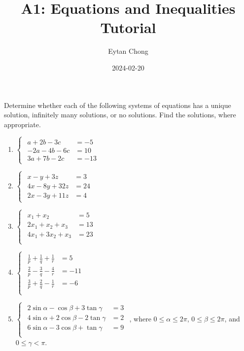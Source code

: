 \documentclass{jhwhw}
\title{A1: Equations and Inequalities\\Tutorial}
\author{Eytan Chong}
\date{2024-02-20}
\begin{document}
    \problem{}
        Determine whether each of the following systems of equations has a unique solution, infinitely many solutions, or no solutions. Find the solutions, where appropriate.

        \begin{enumerate}
            \item $\begin{cases}
                \begin{aligned}
                    a + 2b - 3c &= -5\\
                    -2a - 4b - 6c &= 10\\
                    3a + 7b - 2c &= -13
                \end{aligned}
            \end{cases}$
            \item $\begin{cases}
                \begin{aligned}
                x - y + 3z &= 3\\
                4x - 8y + 32z &= 24\\
                2x - 3y + 11z &= 4
                \end{aligned}
            \end{cases}$
            \item $\begin{cases}
                \begin{aligned}
                    x_1 + x_2 &= 5\\
                    2x_1 + x_2 + x_3 &= 13\\
                    4x_1 + 3x_2 + x_3 &= 23\\
                \end{aligned}
            \end{cases}$
            \item $\begin{cases}
                \begin{aligned}
                    \frac1p + \frac1q + \frac1r &= 5\\
                    \frac2p - \frac3q - \frac4r &= -11\\
                    \frac3p + \frac2q - \frac1r &= -6\\
                \end{aligned}
            \end{cases}$
            \item $\begin{cases}
                \begin{aligned}
                    2\sin\alpha - \cos\beta + 3\tan\gamma &= 3\\
                    4\sin\alpha + 2\cos\beta - 2\tan\gamma &= 2\\
                    6\sin\alpha - 3\cos\beta + \tan\gamma &= 9\\
                \end{aligned}
            \end{cases}$, where $0 \leq \alpha \leq 2\pi$, $0 \leq \beta \leq 2\pi$, and $0 \leq \gamma < \pi$.
        \end{enumerate}
    
\end{document}
